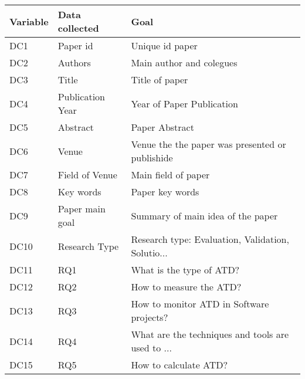 \begin{tabular}{lll}
\toprule
Variable &    Data collected &                                               Goal \\
\midrule
     DC1 &          Paper id &                                    Unique id paper \\
     DC2 &           Authors &                           Main author and colegues \\
     DC3 &             Title &                                     Title of paper \\
     DC4 &  Publication Year &                          Year of Paper Publication \\
     DC5 &          Abstract &                                     Paper Abstract \\
     DC6 &             Venue &    Venue the the paper was presented or publishide \\
     DC7 &    Field of Venue &                                Main field of paper \\
     DC8 &         Key words &                                    Paper key words \\
     DC9 &   Paper main goal &                  Summary of main idea of the paper \\
    DC10 &     Research Type &  Research type: Evaluation, Validation, Solutio... \\
    DC11 &               RQ1 &                           What is the type of ATD? \\
    DC12 &               RQ2 &                            How to measure the ATD? \\
    DC13 &               RQ3 &           How to monitor ATD in Software projects? \\
    DC14 &               RQ4 &  What are the techniques and tools are used to ... \\
    DC15 &               RQ5 &                              How to calculate ATD? \\
\bottomrule
\end{tabular}
